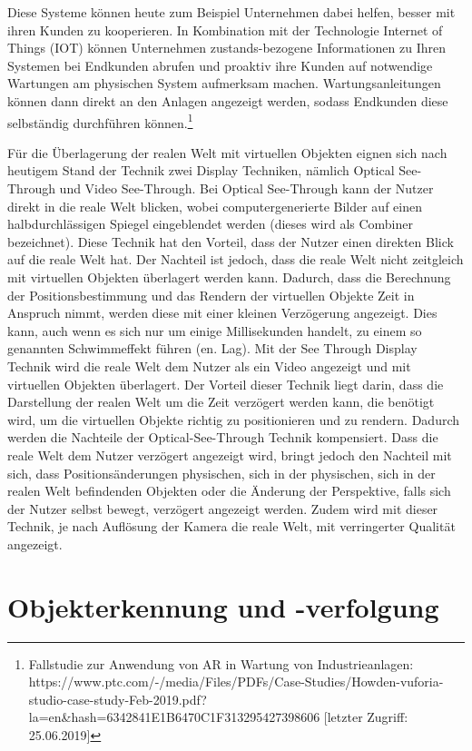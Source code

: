 Diese Systeme können heute zum Beispiel Unternehmen dabei helfen, besser mit ihren Kunden zu kooperieren. In Kombination mit der Technologie Internet of Things (IOT) können Unternehmen
zustands-bezogene Informationen zu Ihren Systemen bei Endkunden abrufen und proaktiv ihre Kunden auf notwendige Wartungen am physischen System aufmerksam machen. Wartungsanleitungen können dann direkt 
an den Anlagen angezeigt werden, sodass Endkunden diese selbständig durchführen können.\footnote{Fallstudie zur Anwendung von AR in Wartung von Industrieanlagen: https://www.ptc.com/-/media/Files/PDFs/Case-Studies/Howden-vuforia-studio-case-study-Feb-2019.pdf?la=en\&hash=6342841E1B6470C1F313295427398606 [letzter Zugriff: 25.06.2019]}

Für die Überlagerung der realen Welt mit virtuellen Objekten eignen sich nach heutigem Stand der Technik zwei Display Techniken, nämlich Optical See-Through und Video See-Through. 
Bei Optical See-Through kann der Nutzer direkt in die reale Welt blicken, wobei computergenerierte Bilder auf einen halbdurchlässigen Spiegel eingeblendet werden (dieses wird als Combiner bezeichnet).
Diese Technik hat den Vorteil, dass der Nutzer einen direkten Blick auf die reale Welt hat. Der Nachteil ist jedoch, dass die reale Welt nicht zeitgleich mit virtuellen Objekten überlagert werden kann. 
Dadurch, dass die Berechnung der Positionsbestimmung und das Rendern der virtuellen Objekte Zeit in Anspruch nimmt, werden diese mit einer kleinen Verzögerung angezeigt. Dies kann, auch 
wenn es sich nur um einige Millisekunden handelt, zu einem so genannten Schwimmeffekt führen (en. Lag). Mit der See Through Display Technik wird die reale Welt dem Nutzer als ein Video 
angezeigt und mit virtuellen Objekten überlagert. Der Vorteil dieser Technik liegt darin, dass die Darstellung der realen Welt um die Zeit verzögert werden kann, die benötigt wird, um die virtuellen Objekte 
richtig zu positionieren und zu rendern. Dadurch werden die Nachteile der Optical-See-Through Technik kompensiert. Dass die reale Welt dem Nutzer verzögert angezeigt wird, bringt jedoch den Nachteil mit sich, 
dass Positionsänderungen physischen, sich in der physischen, sich in der realen Welt befindenden Objekten oder die Änderung der Perspektive, falls sich der Nutzer selbst bewegt, verzögert angezeigt werden. Zudem wird mit 
dieser Technik, je nach Auflösung der Kamera die reale Welt, mit verringerter Qualität angezeigt. \cite[S.~32]{Tonnis2010}

\section{Objekterkennung und -verfolgung}

